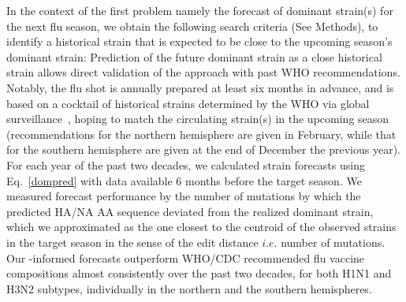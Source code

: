 \documentclass[onecolumn, compsoc,10pt]{IEEEtran}
\begin{document}
In the context of the first problem namely the  forecast of dominant strain(s) for the next flu season,  we obtain the following search criteria (See Methods), to identify a historical strain that is expected to be close to the upcoming season's dominant strain:
%
%
Prediction of the future dominant strain as  a close historical strain  allows direct validation of the approach with past WHO recommendations. Notably, the flu shot  is annually prepared at least six months in advance, and is based on a cocktail of historical strains determined by the WHO via global surveillance~\cite{agor2018models}, hoping to match the circulating strain(s) in the upcoming  season (recommendations for the northern hemisphere are given in February, while that for the southern hemisphere are given at the end of December the previous year). %
For each year of the past two decades, we calculated strain forecasts using  Eq.~\eqref{dompred} with data available 6 months before the target season. %
We  measured forecast performance by the number of mutations by which the predicted HA/NA AA sequence deviated from the realized dominant strain, which we approximated as the one closest to the centroid of the observed strains in the target season in the sense of the edit distance $i.e.$ number of mutations. Our \enet-informed forecasts outperform  WHO/CDC recommended flu vaccine compositions almost consistently over the past two decades, for both H1N1 and H3N2 subtypes, individually in the northern and the southern hemispheres. %
\end{document}
